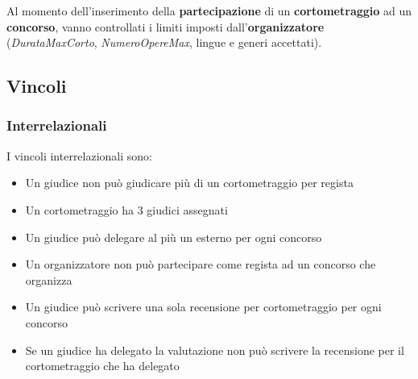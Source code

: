 \begin{note}
	Al momento dell'inserimento della \textbf{partecipazione} di un \textbf{cortometraggio} ad un \textbf{concorso}, vanno controllati i limiti imposti dall'\textbf{organizzatore} (\textit{DurataMaxCorto}, \textit{NumeroOpereMax}, lingue e generi accettati).
\end{note}

\subsection{Vincoli}
\subsubsection{Interrelazionali}
I vincoli interrelazionali sono:
\begin{itemize}
	\item Un giudice non può giudicare più di un cortometraggio per regista
	\item Un cortometraggio ha 3 giudici assegnati
	\item Un giudice può delegare al più un esterno per ogni concorso
	\item Un organizzatore non può partecipare come regista ad un concorso che organizza
	\item Un giudice può scrivere una sola recensione per cortometraggio per ogni concorso
	\item Se un giudice ha delegato la valutazione non può scrivere la recensione per il cortometraggio che ha delegato
\end{itemize}
